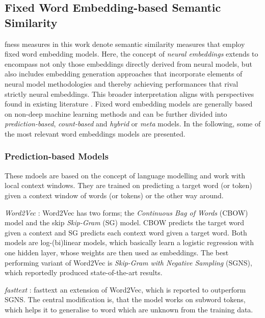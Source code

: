 \documentclass[11pt]{scrreprt}
\let\cite\parencite  %
\begin{document}
\subsection{Fixed Word Embedding-based Semantic Similarity}
\label{sec:fixed-word-embedding-semantic-similairity}
\gls{fness} measures in this work denote semantic similarity measures that employ fixed word embedding models. Here, the concept of \textit{neural embeddings} extends to encompass not only those embeddings directly derived from neural models, but also includes embedding generation approaches that incorporate elements of neural model methodologies and thereby achieving performances that rival strictly neural embeddings. This broader interpretation aligns with perspectives found in existing literature \cite{zucconIntegratingEvaluatingNeural2015, sezererSurveyNeuralWord2021}. Fixed word embedding models are generally based on non-deep machine learning methods and can be further divided into \textit{prediction-based}, \textit{count-based} and \textit{hybrid} or \textit{meta} models. In the following, some of the most relevant word embeddings models are presented. 

\subsubsection{Prediction-based Models} 
These mdoels are based on the concept of language modelling and work with local context windows. They are trained on predicting a target word (or token) given a context window of words (or tokens) or the other way around.

\textit{Word2Vec} \cite{mikolovDistributedRepresentationsWords2013, mikolovLinguisticRegularitiesContinuous2013, mikolovEfficientEstimationWord2013}: Word2Vec has two forms; the \textit{Continuous Bag of Words} (CBOW) model and the skip \textit{Skip-Gram} (SG) model. CBOW predicts the target word given a context and SG predicts each context word given a target word. Both models are log-(bi)linear models, which basically learn a logistic regression with one hidden layer, whose weights are then used as embeddings. The best performing variant of Word2Vec is \textit{Skip-Gram with Negative Sampling} (SGNS), which reportedly produced state-of-the-art results.

\textit{fasttext} \cite{bojanowskiEnrichingWordVectors2017}: fasttext an extension of Word2Vec, which is reported to outperform SGNS. The central modification is, that the model works on subword tokens, which helps it to generalise to word which are unknown from the training data.
\end{document}
